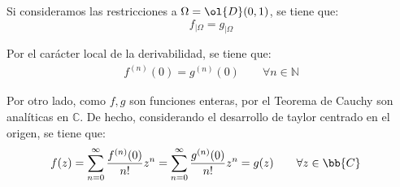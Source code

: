 \documentclass[12pt]{article}
\begin{document}
\begin{ejercicio}
\begin{enumerate}
            Si consideramos las restricciones a $\Omega=\ol{D}(0,1)$, se tiene que:
            \begin{equation*}
                f_{\big| \Omega} = g_{\big| \Omega}
            \end{equation*}

            Por el carácter local de la derivabilidad, se tiene que:
            \begin{align*}
                f^{(n)}(0) = g^{(n)}(0) \qquad \forall n\in \mathbb{N}
            \end{align*}

            Por otro lado, como $f,g$ son funciones enteras, por el Teorema de Cauchy son analíticas en $\mathbb{C}$. De hecho, considerando el desarrollo de taylor centrado en el origen, se tiene que:
            \begin{align*}
                f(z) &= \sum_{n=0}^{\infty} \frac{f^{(n)}(0)}{n!} z^n = \sum_{n=0}^{\infty} \frac{g^{(n)}(0)}{n!} z^n = g(z)\qquad \forall z\in \bb{C}
            \end{align*}
        \end{enumerate}        
    \end{ejercicio}
\end{document}
